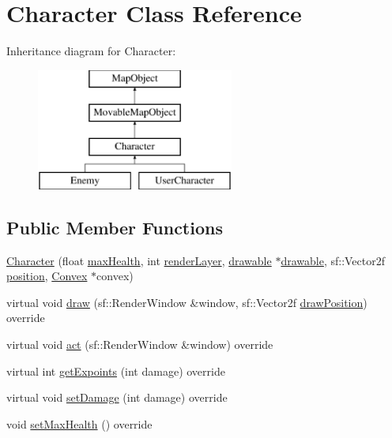 \hypertarget{class_character}{}\section{Character Class Reference}
\label{class_character}
Inheritance diagram for Character\+:\begin{figure}[H]
\begin{center}
\leavevmode
\includegraphics[height=4.000000cm]{class_character}
\end{center}
\end{figure}
\subsection*{Public Member Functions}
\begin{DoxyCompactItemize}
\item 
\hyperlink{class_character_ad2ec6ca17fab7344d8d6575436bbb582}{Character} (float \hyperlink{class_character_a7abef33cbbbc2539fbcbe18c889c3cc4}{max\+Health}, int \hyperlink{class_map_object_ac7431860a4ca955dc3db173926be3856}{render\+Layer}, \hyperlink{classdrawable}{drawable} $\ast$\hyperlink{classdrawable}{drawable}, sf\+::\+Vector2f \hyperlink{class_map_object_a00491cbf8e4cbc729ef37e11f3473860}{position}, \hyperlink{class_convex}{Convex} $\ast$convex)
\item 
virtual void \hyperlink{class_character_a1443dc3d6de5823c6a8905d638012a97}{draw} (sf\+::\+Render\+Window \&window, sf\+::\+Vector2f \hyperlink{class_map_object_a3f383fa967b67989a1d30f8f9ff73936}{draw\+Position}) override
\item 
virtual void \hyperlink{class_character_aa7b139d1bb46168b3d09656da13ef6a4}{act} (sf\+::\+Render\+Window \&window) override
\item 
virtual int \hyperlink{class_character_a47d34faad89aed2ea69959597f1d8a69}{get\+Expoints} (int damage) override
\item 
virtual void \hyperlink{class_character_a95dd6b34d63d6465dfaade4b76079d82}{set\+Damage} (int damage) override
\item 
void \hyperlink{class_character_a848517065963dc5762341834962833d4}{set\+Max\+Health} () override
\end{DoxyCompactItemize}
